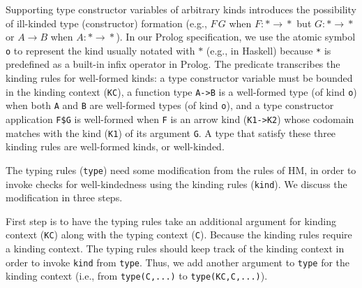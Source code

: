 \documentclass[runningheads,a4paper]{llncs}
\begin{document}
Supporting type constructor variables of
arbitrary kinds introduces the possibility of ill-kinded type (constructor)
formation (e.g., $F\,G$ when $F:*\!\to\!*$ but $G:*\!\to\!*$ \;or\; 
$A\!\to\!B$ when $A:*\!\to\!*$). In our Prolog specification, we use
the atomic symbol \verb|o| to represent the kind usually notated with $*$
(e.g., in Haskell) because \verb|*| is predefined as a built-in infix
operator in Prolog. The  predicate transcribes the kinding rules
for well-formed kinds: a type constructor variable must be bounded in
the kinding context (\verb|KC|), a function type \verb|A->B| is
a well-formed type (of kind \verb|o|) when both \verb|A| and \verb|B|
are well-formed types (of kind \verb|o|), and a type constructor application
\verb|F$G| is well-formed when \verb|F| is an arrow kind (\verb|K1->K2|)
whose codomain matches with the kind (\verb|K1|) of its argument \verb|G|.
A type that satisfy these three kinding rules are well-formed kinds, 
or well-kinded.

The typing rules (\verb|type|) need some modification from the rules of HM,
in order to invoke checks for well-kindedness using the kinding rules
(\verb|kind|). We discuss the modification in three steps.

First step is to have the typing rules take an additional argument for
kinding context (\verb|KC|) along with the typing context (\verb|C|).
Because the kinding rules require a kinding context. The typing rules
should keep track of the kinding context in order to invoke \verb|kind|
from \verb|type|. Thus, we add another argument to \verb|type| for
the kinding context (i.e., from \verb|type(C,...)| to \verb|type(KC,C,...)|).
\end{document}
